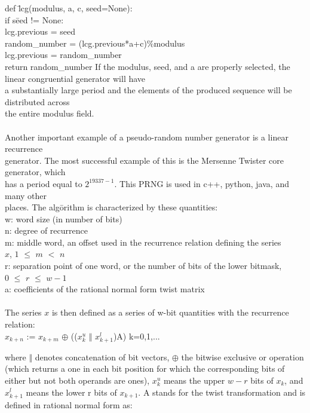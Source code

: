 \documentclass[12pt]{article}
\begin{document}
\begin{tabbing}
def \= lcg(modulus, a, c, seed=None):\\
\> if s\=eed != None:\\
\> \> lcg.previous = seed\\
\> random\_number = (lcg.previous*a+c)\%modulus\\
\> lcg.previous = random\_number\\
\> return random\_number
If the modulus, seed, and a are properly selected, the linear congruential generator will have\\
a substantially large period and the elements of the produced sequence will be distributed across\\
the entire  modulus field.\\\\
Another important example of a pseudo-random number generator is a linear recurrence\\
generator. The most successful example of this is the Mersenne Twister core generator, which\\
has a period equal to $2^{19337-1}$. This PRNG is used in c++, python, java, and many other\\
places. The alg\=orithm is characterized by these quantities:\\
\>w: word size (in number of bits)\\
\>n: degree of recurrence\\
\>m: middle word, an offset used in the recurrence relation defining the series\\
\> $x$, $1$ $\leq$ $m$ $<$ $n$\\
\>r: separation point of one word, or the number of bits of the lower bitmask,\\
\> $0$ $\leq$ $r$ $\leq$ $w-1$\\
\>a: coefficients of the rational normal form twist matrix\\\\
The series $x$ is then defined as a series of w-bit quantities with the recurrence relation:\\
\>$x_{k+n}$ := $x_{k+m}$ $\oplus$  (($x_k^u$ $\Vert$ $x_{k+1}^l$)A)       k=0,1,...
\end{tabbing}
where $\Vert$ denotes concatenation of bit vectors, $\oplus$ the bitwise exclusive or operation (which returns a one in each bit position for which the corresponding bits of either but not both operands are ones), $x_k^u$ means the upper $w-r$ bits of $x_k$, and $x_{k+1}^l$ means the lower r bits of $x_{k+1}$. A stands for the twist transformation and is defined in rational normal form as:\\
\end{document}
